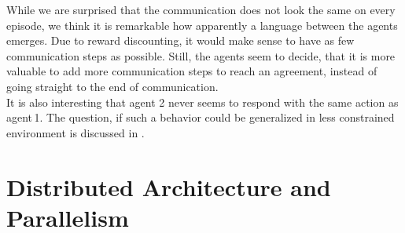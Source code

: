 While we are surprised that the communication does not look the same on every episode, we think it is remarkable how apparently a language between the agents emerges. Due to reward discounting, it would make sense to have as few communication steps as possible. Still, the agents seem to decide, that it is more valuable to add more communication steps to reach an agreement, instead of going straight to the end of communication.\\
It is also interesting that agent 2 never seems to respond with the same action as agent\,1. The question, if such a behavior could be generalized in less constrained environment is discussed in .
\newpage
\section{Distributed Architecture and Parallelism}\label{dist_architecture}

